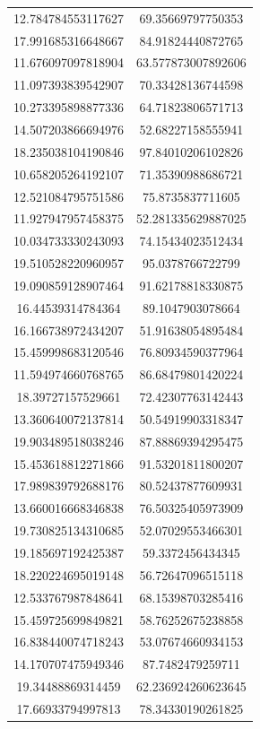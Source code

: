 \begin{table}
\begin{tabular}{cc}
12.784784553117627 & 69.35669797750353 \\
17.991685316648667 & 84.91824440872765 \\
11.676097097818904 & 63.577873007892606 \\
11.097393839542907 & 70.33428136744598 \\
10.273395898877336 & 64.71823806571713 \\
14.507203866694976 & 52.68227158555941 \\
18.235038104190846 & 97.84010206102826 \\
10.658205264192107 & 71.35390988686721 \\
12.521084795751586 & 75.8735837711605 \\
11.927947957458375 & 52.281335629887025 \\
10.034733330243093 & 74.15434023512434 \\
19.510528220960957 & 95.0378766722799 \\
19.090859128907464 & 91.62178818330875 \\
16.44539314784364 & 89.1047903078664 \\
16.166738972434207 & 51.91638054895484 \\
15.459998683120546 & 76.80934590377964 \\
11.594974660768765 & 86.68479801420224 \\
18.39727157529661 & 72.42307763142443 \\
13.360640072137814 & 50.54919903318347 \\
19.903489518038246 & 87.88869394295475 \\
15.453618812271866 & 91.53201811800207 \\
17.989839792688176 & 80.52437877609931 \\
13.660016668346838 & 76.50325405973909 \\
19.730825134310685 & 52.07029553466301 \\
19.185697192425387 & 59.3372456434345 \\
18.220224695019148 & 56.72647096515118 \\
12.533767987848641 & 68.15398703285416 \\
15.459725699849821 & 58.76252675238858 \\
16.838440074718243 & 53.07674660934153 \\
14.170707475949346 & 87.7482479259711 \\
19.34488869314459 & 62.236924260623645 \\
17.66933794997813 & 78.34330190261825 \\

\end{tabular}
\end{table}
